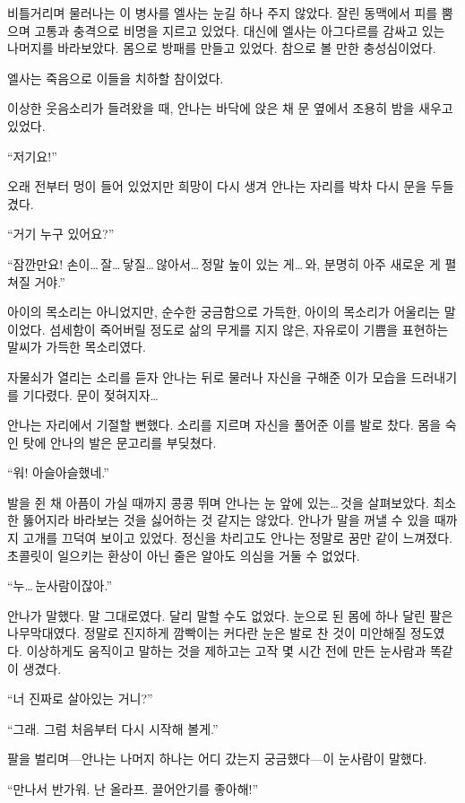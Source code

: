 비틀거리며 물러나는 이 병사를 엘사는 눈길 하나 주지 않았다. 잘린 동맥에서 피를 뿜으며 고통과 충격으로 비명을 지르고 있었다. 대신에 엘사는 아그다르를 감싸고 있는 나머지를 바라보았다. 몸으로 방패를 만들고 있었다. 참으로 볼 만한 충성심이었다.

엘사는 죽음으로 이들을 치하할 참이었다.

\textbreak

이상한 웃음소리가 들려왔을 때, 안나는 바닥에 앉은 채 문 옆에서 조용히 밤을 새우고 있었다.

``저기요!''

오래 전부터 멍이 들어 있었지만 희망이 다시 생겨 안나는 자리를 박차 다시 문을 두들겼다.

``거기 누구 있어요?''

``잠깐만요! 손이\ldots\,잘\ldots\,닿질\ldots\,않아서\ldots\,정말 높이 있는 게\ldots\,와, 분명히 아주 새로운 게 펼쳐질 거야.''

아이의 목소리는 아니었지만, 순수한 궁금함으로 가득한, 아이의 목소리가 어울리는 말이었다. 섬세함이 죽어버릴 정도로 삶의 무게를 지지 않은, 자유로이 기쁨을 표현하는 말씨가 가득한 목소리였다.

자물쇠가 열리는 소리를 듣자 안나는 뒤로 물러나 자신을 구해준 이가 모습을 드러내기를 기다렸다. 문이 젖혀지자\ldots

안나는 자리에서 기절할 뻔했다. 소리를 지르며 자신을 풀어준 이를 발로 찼다. 몸을 숙인 탓에 안나의 발은 문고리를 부딪쳤다.

``워! 아슬아슬했네.''

발을 쥔 채 아픔이 가실 때까지 콩콩 뛰며 안나는 눈 앞에 있는\ldots\,것을 살펴보았다. 최소한 뚫어지라 바라보는 것을 싫어하는 것 같지는 않았다. 안나가 말을 꺼낼 수 있을 때까지 고개를 끄덕여 보이고 있었다. 정신을 차리고도 안나는 정말로 꿈만 같이 느껴졌다. 초콜릿이 일으키는 환상이 아닌 줄은 알아도 의심을 거둘 수 없었다.

``누\ldots\,눈사람이잖아.''

안나가 말했다. 말 그대로였다. 달리 말할 수도 없었다. 눈으로 된 몸에 하나 달린 팔은 나무막대였다. 정말로 진지하게 깜빡이는 커다란 눈은 발로 찬 것이 미안해질 정도였다. 이상하게도 움직이고 말하는 것을 제하고는 고작 몇 시간 전에 만든 눈사람과 똑같이 생겼다.

``너 진짜로 살아있는 거니?''

``그래. 그럼 처음부터 다시 시작해 볼게.''

팔을 벌리며—안나는 나머지 하나는 어디 갔는지 궁금했다—이 눈사람이 말했다.

``만나서 반가워. 난 올라프. 끌어안기를 좋아해!''

